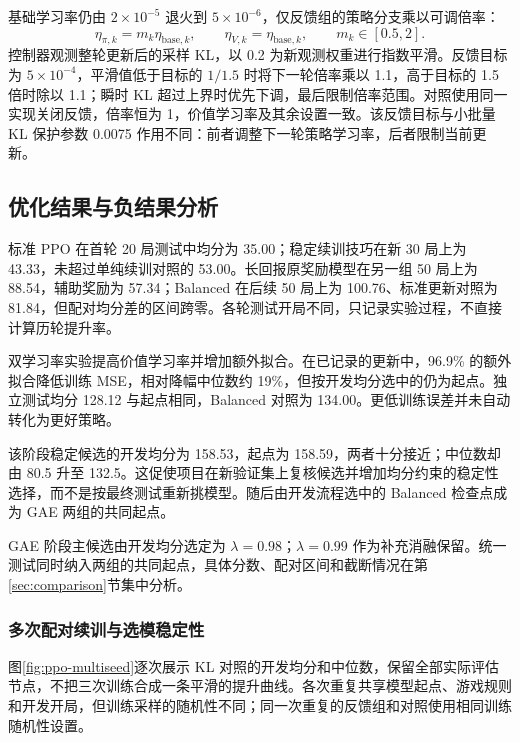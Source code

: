 基础学习率仍由 $2\times10^{-5}$ 退火到 $5\times10^{-6}$，仅反馈组的策略分支乘以可调倍率：
\begin{equation}
 \eta_{\pi,k}=m_k\eta_{\mathrm{base},k},\qquad
 \eta_{V,k}=\eta_{\mathrm{base},k},\qquad
 m_k\in[0.5,2].
\end{equation}
控制器观测整轮更新后的采样 KL，以 0.2 为新观测权重进行指数平滑。反馈目标为 $5\times10^{-4}$，平滑值低于目标的 $1/1.5$ 时将下一轮倍率乘以 1.1，高于目标的 1.5 倍时除以 1.1；瞬时 KL 超过上界时优先下调，最后限制倍率范围。对照使用同一实现关闭反馈，倍率恒为 1，价值学习率及其余设置一致。该反馈目标与小批量 KL 保护参数 0.0075 作用不同：前者调整下一轮策略学习率，后者限制当前更新。

\subsection{优化结果与负结果分析}
标准 PPO 在首轮 20 局测试中均分为 35.00；稳定续训技巧在新 30 局上为 43.33，未超过单纯续训对照的 53.00。长回报原奖励模型在另一组 50 局上为 88.54，辅助奖励为 57.34；Balanced 在后续 50 局上为 100.76、标准更新对照为 81.84，但配对均分差的区间跨零。各轮测试开局不同，只记录实验过程，不直接计算历轮提升率。

双学习率实验提高价值学习率并增加额外拟合。在已记录的更新中，96.9\% 的额外拟合降低训练 MSE，相对降幅中位数约 19\%，但按开发均分选中的仍为起点。独立测试均分 128.12 与起点相同，Balanced 对照为 134.00。更低训练误差并未自动转化为更好策略。

该阶段稳定候选的开发均分为 158.53，起点为 158.59，两者十分接近；中位数却由 80.5 升至 132.5。这促使项目在新验证集上复核候选并增加均分约束的稳定性选择，而不是按最终测试重新挑模型。随后由开发流程选中的 Balanced 检查点成为 GAE 两组的共同起点。

GAE 阶段主候选由开发均分选定为 $\lambda=0.98$；$\lambda=0.99$ 作为补充消融保留。统一测试同时纳入两组的共同起点，具体分数、配对区间和截断情况在第\ref{sec:comparison}节集中分析。

\subsubsection{多次配对续训与选模稳定性}
图\ref{fig:ppo-multiseed}逐次展示 KL 对照的开发均分和中位数，保留全部实际评估节点，不把三次训练合成一条平滑的提升曲线。各次重复共享模型起点、游戏规则和开发开局，但训练采样的随机性不同；同一次重复的反馈组和对照使用相同训练随机性设置。


